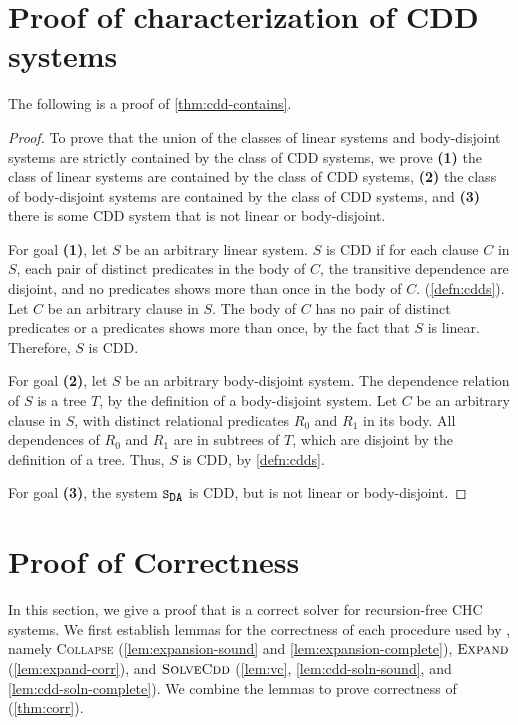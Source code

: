 \section{Proof of characterization of CDD systems}
\label{app:char}
The following is a proof of \autoref{thm:cdd-contains}.
%
\begin{proof}
  To prove that the union of the classes of linear systems and
  body-disjoint systems are strictly contained by the class of CDD
  systems, we prove %
  \textbf{(1)} the class of linear systems are contained by the class
  of CDD systems, %
  \textbf{(2)} the class of body-disjoint systems are contained by the
  class of CDD systems, and %
  \textbf{(3)} there is some CDD system that is not linear or
  body-disjoint.

  For goal \textbf{(1)}, let $S$ be an arbitrary linear
  system.
  $S$ is CDD if for each clause $C$ in
  $S$, each pair of distinct predicates in
  the body of $C$, the transitive dependence are disjoint, and
  no predicates shows more than once in the body of $C$.
  (\autoref{defn:cdds}).
  Let $C$ be an arbitrary clause in $S$.
  The body of $C$ has no pair of distinct predicates or a predicates shows more than once, by the fact that
  $S$ is linear.
  Therefore, $S$ is CDD.

  For goal \textbf{(2)}, let $S$ be an arbitrary
  body-disjoint system.
  The dependence relation of $S$ is a tree $T$, by the
  definition of a body-disjoint system.
  Let $C$ be an arbitrary clause in $S$, with
  distinct relational predicates $R_0$ and $R_1$ in its body.
  All dependences of $R_0$ and $R_1$ are in subtrees of $T$, which
  are disjoint by the definition of a tree.
  Thus, $S$ is CDD, by \autoref{defn:cdds}.

  For goal \textbf{(3)}, the system $\mcchc$ is CDD, but is not linear
  or body-disjoint.
\end{proof}

\section{Proof of Correctness}
\label{app:corr}
%
In this section, we give a proof that \sys is a correct solver for
recursion-free CHC systems.
%
We first establish lemmas for the correctness of each procedure used
by \sys, namely \textsc{Collapse} (\autoref{lem:expansion-sound} and
\autoref{lem:expansion-complete}), $\textsc{Expand}$
(\autoref{lem:expand-corr}), and $\textsc{SolveCdd}$
(\autoref{lem:vc}, \autoref{lem:cdd-soln-sound}, and
\autoref{lem:cdd-soln-complete}).
%
We combine the lemmas to prove correctness of \sys
(\autoref{thm:corr}).

